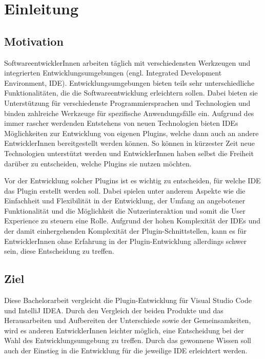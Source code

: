 \chapter{Einleitung}
\label{cha:Einleitung}


\section{Motivation}
\label{sec:Motivation}

SoftwareentwicklerInnen arbeiten täglich mit verschiedensten 
Werkzeugen und integrierten Entwicklungsumgebungen 
(engl. Integrated Development Environment, IDE). Entwicklungsumgebungen 
bieten teils sehr unterschiedliche Funktionalitäten, die 
die Softwareentwicklung erleichtern sollen. Dabei bieten 
sie Unterstützung für verschiedenste Programmiersprachen 
und Technologien und binden zahlreiche Werkzeuge für 
spezifische Anwendungsfälle ein. Aufgrund des immer rascher
werdenden Entstehens von neuen Technologien bieten
IDEs Möglichkeiten zur Entwicklung von eigenen 
Plugins, welche dann auch an andere EntwicklerInnen 
bereitgestellt werden können. So können in kürzester 
Zeit neue Technologien unterstützt werden und 
EntwicklerInnen haben selbst die Freiheit darüber zu 
entscheiden, welche Plugins sie nutzen möchten.

Vor der Entwicklung solcher Plugins ist es wichtig 
zu entscheiden, für welche IDE das Plugin erstellt 
werden soll. Dabei spielen unter anderem Aspekte wie 
die Einfachheit und Flexibilität in der Entwicklung, 
der Umfang an angebotener Funktionalität und die Möglichkeit
die Nutzerinteraktion und somit die User Experience 
zu steuern eine Rolle. Aufgrund der hohen 
Komplexität der IDEs und der damit einhergehenden 
Komplexität der Plugin-Schnittstellen, kann es für EntwicklerInnen
ohne Erfahrung in der Plugin-Entwicklung allerdings schwer sein,
diese Entscheidung zu treffen.

\section{Ziel}
\label{sec:Ziel}

Diese Bachelorarbeit vergleicht die Plugin-Entwicklung 
für Visual Studio Code und IntelliJ IDEA. 
Durch den Vergleich der beiden Produkte 
und das Herausarbeiten und Aufbereiten der Unterschiede 
sowie der Gemeinsamkeiten, wird es anderen 
EntwicklerInnen leichter möglich, eine Entscheidung
bei der Wahl des Entwicklungsumgebung zu treffen.
Durch das gewonnene Wissen soll auch der Einstieg
in die Entwicklung für die jeweilige IDE erleichtert werden.

